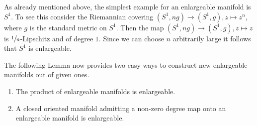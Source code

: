 As already mentioned above, the simplest example for an enlargeable manifold is $S^1$. To see this consider the Riemannian covering $(S^1,n g) \to (S^1, g), z \mapsto z^n$, where $g$ is the standard metric on $S^1$. Then the map $(S^1,n g) \to (S^1, g), z \mapsto z$ is $\sfrac{1}{n}$-Lipschitz and of degree $1$. Since we can choose $n$ arbitrarily large it follows that $S^1$ is enlargeable. 

The following Lemma now provides two easy ways to construct new enlargeable manifolds out of given ones. 

\begin{lemma}
    \label{lem:constructing_enlargeable_mnf}
    \begin{enumerate}[label=(\roman*)]
        \item The product of enlargeable manifolds is enlargeable. \label{eq:lem_for_constructing_enlargeable_mnf_1}
        \item A closed oriented manifold admitting a non-zero degree map onto an enlargeable manifold is enlargeable. \label{eq:lem_for_constructing_enlargeable_mnf_2}
    \end{enumerate}
\end{lemma}

